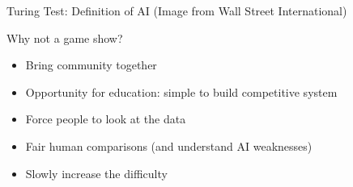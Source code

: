 \documentclass[xcolor=dvipsnames,xcolor=table]{beamer}
\newcommand{\fsi}[2]{
\begin{frame}[plain]
\vspace*{-1pt}
\makebox[\linewidth]{\texttt{[image: \#1]}}
\begin{center}
#2
\end{center}
\end{frame}
}
\begin{document}
\fsi{qb/turing}{Turing Test: Definition of AI (Image from Wall Street
  International)}

\begin{frame}{Why not a game show?}

  \begin{itemize}
  \item Bring community together
  \item Opportunity for education: simple to build competitive system
  \item Force people to look at the data
  \item Fair human comparisons (and understand AI weaknesses)
  \item Slowly increase the difficulty
  \end{itemize}

\end{frame}
\end{document}
